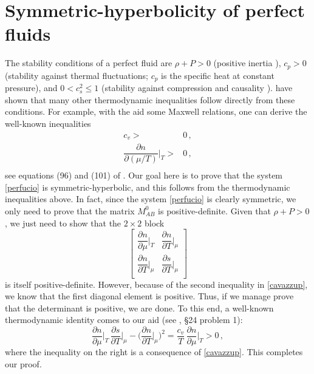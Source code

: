 \documentclass[a4paper, amsfonts, amssymb, amsmath, reprint, showkeys, nofootinbib, twoside, onecolumn,notitlepage]{revtex4-1}
\begin{document}
\section{Symmetric-hyperbolicity of perfect fluids}\label{symmuzko}

The stability conditions of a perfect fluid are $\rho+P>0$ (positive inertia \cite{GavassinoStabilityCarter2022,MTW_book}), $c_p>0$ (stability against thermal fluctuations; $c_p$ is the specific heat at constant pressure), and $0<c_s^2\leq 1$ (stability against compression and causality \cite{GavassinoCausality2021,GavassinoSuperluminal2021}). \citet{Hishcock1983} have shown that many other thermodynamic inequalities follow directly from these conditions. For example, with the aid some Maxwell relations, one can derive the well-known inequalities
\begin{equation}\label{cavazzup}
\begin{split}
 c_v >{}& 0 \, , \\
 \dfrac{\partial n}{\partial (\mu/T)}\bigg|_T >{}& 0 \, , \\
\end{split}
\end{equation}
see equations (96) and (101) of \cite{Hishcock1983}. Our goal here is to prove that the system \eqref{perfucio} is symmetric-hyperbolic, and this follows from the thermodynamic inequalities above. In fact, since the system \eqref{perfucio} is clearly symmetric, we only need to prove that the matrix $M^0_{AB}$ is positive-definite. Given that $\rho+P>0$, we just need to show that the $2\times 2$ block
\begin{equation}
\begin{bmatrix}
   \dfrac{\partial n}{\partial \mu}\bigg|_T & \dfrac{\partial n}{\partial T}\bigg|_\mu   \\
  \dfrac{\partial n}{\partial T}\bigg|_\mu &  \dfrac{\partial s}{\partial T}\bigg|_\mu \\
\end{bmatrix}
\end{equation} 
is itself positive-definite. However, because of the second inequality in \eqref{cavazzup}, we know that the first diagonal element is positive. Thus, if we manage prove that the determinant is positive, we are done. To this end, a well-known thermodynamic identity comes to our aid (see \citet{landau5}, \S 24 problem 1):
\begin{equation}
\dfrac{\partial n}{\partial \mu}\bigg|_T \, \dfrac{\partial s}{\partial T}\bigg|_\mu -\bigg(\dfrac{\partial n}{\partial T}\bigg|_\mu\bigg)^2 = \dfrac{c_v}{T} \, \dfrac{\partial n}{\partial \mu}\bigg|_T  > 0\, ,
\end{equation}
where the inequality on the right is a consequence of \eqref{cavazzup}. This completes our proof.






\label{lastpage}
\end{document}
